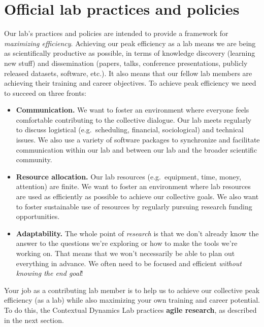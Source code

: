 \documentclass{tufte-book} %
\begin{document}
\chapter{Official lab practices and policies}\label{ch:policy}
Our lab's practices and policies are intended to provide a framework
for \textit{maximizing efficiency}.  Achieving our peak efficiency as
a lab means we are being as scientifically productive as possible, in
terms of knowledge discovery (learning new stuff) and dissemination
(papers, talks, conference presentations, publicly released datasets,
software, etc.). It also means that our fellow lab members are
achieving their training and career objectives.  To achieve peak
efficiency we need to succeed on three fronts:
\begin{itemize}
\item \textbf{Communication.}  We want to foster an environment where
  everyone feels comfortable contributing to the collective dialogue.
  Our lab meets regularly to discuss logistical (e.g.\ scheduling, financial,
  sociological) and technical issues.  We also use a variety of
  software packages to synchronize and facilitate communication within
  our lab and between our lab and the broader scientific community.
\item \textbf{Resource allocation.}  Our lab resources (e.g.\
  equipment, time, money, attention) are finite.  We want to foster an
  environment where lab resources are used as efficiently as possible
  to achieve our collective goals.  We also want to foster
  sustainable use of resources by regularly pursuing research funding opportunities.
\item \textbf{Adaptability.}  The whole point of \textit{research} is that we
  don't already know the answer to the questions we're exploring or
  how to make the tools we're working on.  That means that we won't
  necessarily be able to plan out everything in advance.  We often need to
  be focused and efficient \textit{without knowing the end goal}!
\end{itemize}
Your job as a contributing lab member is to help us to achieve our
collective peak efficiency (as a lab) while also maximizing your own
training and career potential.  To do this, the Contextual Dynamics
Lab practices \textbf{agile research}, as described in the next section.

\end{document}
